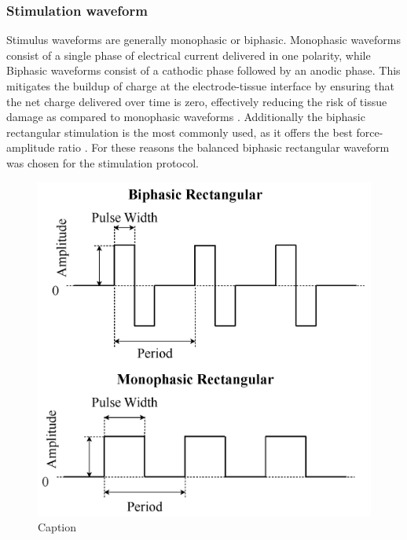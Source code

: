 \subsubsection{Stimulation waveform}
Stimulus waveforms are generally monophasic or biphasic. Monophasic waveforms consist of a single phase of electrical current delivered in one polarity, while Biphasic waveforms consist of a cathodic phase followed by an anodic phase. This mitigates the buildup of charge at the electrode-tissue interface by ensuring that the net charge delivered over time is zero, effectively reducing the risk of tissue damage as compared to monophasic waveforms \cite{peckham_functional_2005}. Additionally the biphasic rectangular stimulation is the most commonly used, as it offers the best force-amplitude ratio
\cite{lynch_functional_2008}. For these reasons the balanced biphasic rectangular waveform was chosen for the stimulation protocol.
 \begin{figure} [H]
     \centering
     \includegraphics[width=0.6\linewidth]{images/twowaveform.jpg}
     \caption{Caption}
     \label{fig:enter-label}
 \end{figure}

